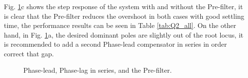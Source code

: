 \documentclass[11pt, a4paper]{article}
\begin{document}
Fig. \ref{fig:Q2_all}c shows the step response of the system with and without the Pre-filter, it is clear that the Pre-filter reduces the overshoot in both cases with good settling time, the performance results can be seen in Table \ref{tab:Q2_all}. On the other hand, in Fig. \ref{fig:Q2_all}a, the desired dominant poles are slightly out of the root locus, it is recommended to add a second Phase-lead compensator in series in order correct that gap.
\begin{figure}[!ht]
	\centering
	\caption{Phase-lead, Phase-lag in series, and the Pre-filter.}
	\label{fig:Q2_all}
\end{figure}
\end{document}

